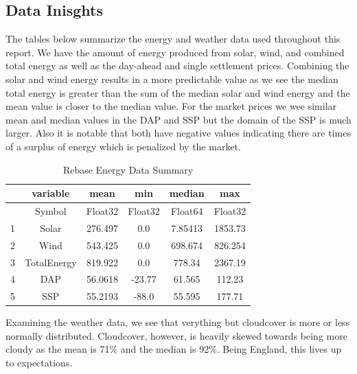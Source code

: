 \documentclass[
  journal,
]{IEEEtran}%
\begin{document}
\subsection{Data Inisghts}\label{data-inisghts}

The tables below summarize the energy and weather data used throughout
this report. We have the amount of energy produced from solar, wind, and
combined total energy as well as the day-ahead and single settlement
prices. Combining the solar and wind energy results in a more
predictable value as we see the median total energy is greater than the
sum of the median solar and wind energy and the mean value is closer to
the median value. For the market prices we wee similar mean and median
values in the DAP and SSP but the domain of the SSP is much larger. Also
it is notable that both have negative values indicating there are times
of a surplus of energy which is penalized by the market.

\label{rebase-data-summary}
\begin{table}
\caption{Rebase Energy Data Summary}\tabularnewline

\centering
\begin{tabular}{r|ccccc}
    & variable & mean & min & median & max\\
    \hline
    & Symbol & Float32 & Float32 & Float64 & Float32\\
    \hline
    1 & Solar & 276.497 & 0.0 & 7.85413 & 1853.73 \\
    2 & Wind & 543.425 & 0.0 & 698.674 & 826.254 \\
    3 & TotalEnergy & 819.922 & 0.0 & 778.34 & 2367.19 \\
    4 & DAP & 56.0618 & -23.77 & 61.565 & 112.23 \\
    5 & SSP & 55.2193 & -88.0 & 55.595 & 177.71 \\
\end{tabular}
\end{table}

Examining the weather data, we see that verything but cloudcover is more
or less normally distributed. Cloudcover, however, is heavily skewed
towards being more cloudy as the mean is 71\% and the median is 92\%.
Being England, this lives up to expectations.
\end{document}
